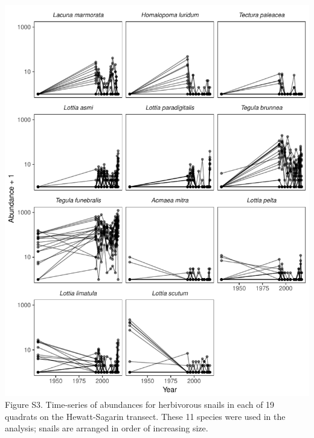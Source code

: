 \documentclass[11pt,]{article}
\begin{document}
\newpage

\includegraphics[width=1.00000\textwidth]{../../figs_ms/abund_year_raw_subset_herb.pdf}
Figure S3. Time-series of abundances for herbivorous snails in each of
19 quadrats on the Hewatt-Sagarin transect. These 11 species were used
in the analysis; snails are arranged in order of increasing size.
\end{document}
